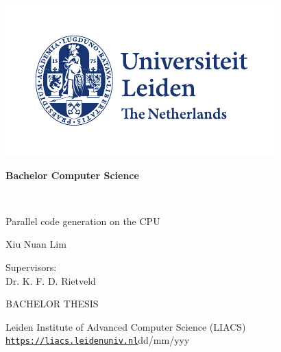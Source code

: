 \thispagestyle{empty}

\includegraphics{UL_Algemeen internationaal_CMYK}

\vspace{-2cm}\hfill \begin{LARGE}\textbf{Bachelor Computer Science}\end{LARGE} \\

\vspace{3.5cm}
\begin{Large}
\hfill Parallel code generation on the CPU

\vspace{2.5cm}

\hfill Xiu Nuan Lim
\end{Large}

\vspace{6cm}

\begin{large}

Supervisors:\\
Dr. K. F. D. Rietveld


\vspace{2.8cm}
BACHELOR THESIS

\vspace{5mm}
Leiden Institute of Advanced Computer Science (LIACS)\\
\href{https://liacs.leidenuniv.nl}{\underline{\texttt{https://liacs.leidenuniv.nl}}}\hfill dd/mm/yyy
\end{large}

\newpage

